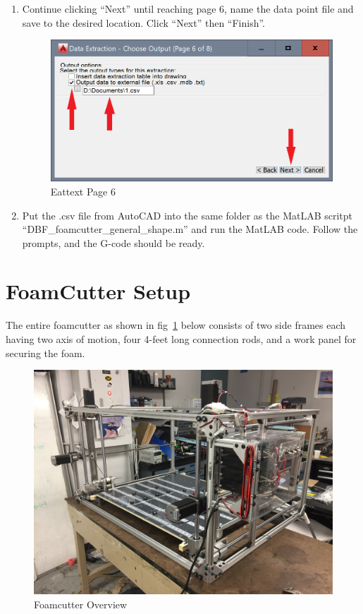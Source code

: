 \documentclass[titlepage,10pt,letter]{report}
\numberwithin{equation}{chapter}
\begin{document}
\begin{enumerate}[noitemsep,topsep=0pt]
	\item Continue clicking ``Next'' until reaching page 6, name the data point file and save to the desired location. Click ``Next'' then ``Finish''.
	\begin{figure} [H]
		\includegraphics[width = 0.6\linewidth]{./Figures/general_shape/cad9.png}
		\caption{Eattext Page 6}
	\end{figure}

	\item Put the .csv file from AutoCAD into the same folder as the MatLAB scritpt ``DBF\_foamcutter\_general\_shape.m'' and run the MatLAB code. Follow the prompts, and the G-code should be ready.


\end{enumerate}


\section{FoamCutter Setup}

The entire foamcutter as shown in fig~\ref{fig:overview} below consists of two side frames each having two axis of motion, four 4-feet long connection rods, and a work panel for securing the foam. 

\begin{figure} [H]
	\includegraphics[width = 0.9\linewidth]{./Figures/overview.jpg}
	\caption{Foamcutter Overview}
	\label{fig:overview}
\end{figure}
\end{document}
